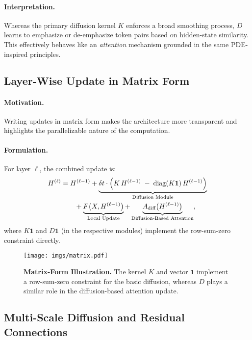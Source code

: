 \paragraph{Interpretation.}
Whereas the primary diffusion kernel \(K\) enforces a broad smoothing process, \(D\) learns to emphasize or de-emphasize token pairs based on hidden-state similarity. This effectively behaves like an \emph{attention} mechanism grounded in the same PDE-inspired principles.

\subsection{Layer-Wise Update in Matrix Form}
\paragraph{Motivation.}
Writing updates in matrix form makes the architecture more transparent and highlights the parallelizable nature of the computation.

\paragraph{Formulation.}
For layer \(\ell\), the combined update is:
\[
\begin{aligned}
H^{(\ell)} 
&= H^{(\ell-1)} 
+ \underbrace{\delta t \cdot \Bigl(K \, H^{(\ell-1)} 
  \;-\; \operatorname{diag}(K \mathbf{1}) \, H^{(\ell-1)}\Bigr)}_{\text{Diffusion Module}}
\\
&\quad\quad+ \underbrace{F\bigl(X, H^{(\ell-1)}\bigr)}_{\text{Local Update}}
+ \underbrace{A_{\text{diff}}\bigl(H^{(\ell-1)}\bigr)}_{\text{Diffusion-Based Attention}},
\end{aligned}
\]
where \(K \mathbf{1}\) and \(D \mathbf{1}\) (in the respective modules) implement the row-sum-zero constraint directly.

\begin{figure}[htb]
  \centering
  \texttt{[image: imgs/matrix.pdf]}
  \caption{\textbf{Matrix-Form Illustration.} 
  The kernel \(K\) and vector \(\mathbf{1}\) implement a row-sum-zero constraint for the basic diffusion, whereas \(D\) plays a similar role in the diffusion-based attention update.}
  \label{fig:matrix-operations}
\end{figure}

\subsection{Multi-Scale Diffusion and Residual Connections}
